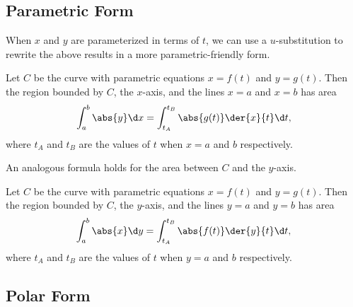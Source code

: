\subsection{Parametric Form}

When $x$ and $y$ are parameterized in terms of $t$, we can use a $u$-substitution to rewrite the above results in a more parametric-friendly form.

\begin{proposition}
    Let $C$ be the curve with parametric equations $x = f(t)$ and $y = g(t)$. Then the region bounded by $C$, the $x$-axis, and the lines $x = a$ and $x = b$ has area \[\int_a^b \abs{y} \d x = \int_{t_A}^{t_B} \abs{g(t)} \der{x}{t} \d t,\] where $t_A$ and $t_B$ are the values of $t$ when $x = a$ and $b$ respectively.
\end{proposition}

An analogous formula holds for the area between $C$ and the $y$-axis.

\begin{proposition}
    Let $C$ be the curve with parametric equations $x = f(t)$ and $y = g(t)$. Then the region bounded by $C$, the $y$-axis, and the lines $y = a$ and $y = b$ has area \[\int_a^b \abs{x} \d y = \int_{t_A}^{t_B} \abs{f(t)} \der{y}{t} \d t,\] where $t_A$ and $t_B$ are the values of $t$ when $y = a$ and $b$ respectively.
\end{proposition}

\subsection{Polar Form}

